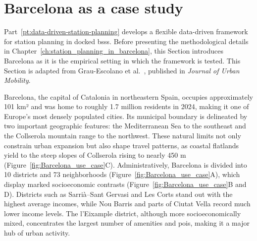 \begingroup
\let\cleardoublepage\relax
\let\clearpage\relax
\vspace{25pt}
\chapter*{Barcelona as a case study}
\label{ch:use_case_barcelona}
\endgroup
\vspace{-45pt} %

\begingroup
\setcounter{figure}{0}
\setcounter{table}{0}
\renewcommand{\thefigure}{III.\arabic{figure}}
\renewcommand{\thetable}{III.\arabic{table}}

Part~\ref{pt:data-driven-station-planning} develops a flexible data-driven framework for station planning in docked \acp{bss}. Before presenting the methodological details in Chapter~\ref{ch:station_planning_in_barcelona}, this Section introduces Barcelona as it is the empirical setting in which the framework is tested. This Section is adapted from Grau-Escolano et al.~\cite{GrauEscolano2025}, published in \textit{Journal of Urban Mobility}.

Barcelona, the capital of Catalonia in northeastern Spain, occupies approximately 101 km² and was home to roughly 1.7 million residents in 2024, making it one of Europe’s most densely populated cities. Its municipal boundary is delineated by two important geographic features: the Mediterranean Sea to the southeast and the Collserola mountain range to the northwest. These natural limits not only constrain urban expansion but also shape travel patterns, as coastal flatlands yield to the steep slopes of Collserola rising to nearly 450 m (Figure~\ref{fig:Barcelona_use_case}C). Administratively, Barcelona is divided into 10 districts and 73 neighborhoods (Figure~\ref{fig:Barcelona_use_case}A), which display marked socioeconomic contrasts (Figure~\ref{fig:Barcelona_use_case}B and D). Districts such as Sarrià–Sant Gervasi and Les Corts stand out with the highest average incomes, while Nou Barris and parts of Ciutat Vella record much lower income levels. The l'Eixample district, although more socioeconomically mixed, concentrates the largest number of amenities and \acp{poi}, making it a major hub of urban activity. 



